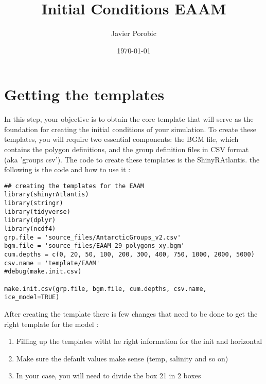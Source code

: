 \documentclass[a4paper]{article}
\author{Javier Porobic}
\date{\today}
\title{Initial Conditions EAAM}
\begin{document}
\maketitle
\tableofcontents

\tableofcontents

\section{Getting the templates}
\label{sec:org626dc59}
In this step, your objective is to obtain the core template that will serve as the
foundation for creating the initial conditions of your simulation. To create these
templates, you will require two essential components: the BGM file, which contains
the polygon definitions, and the group definition files in CSV format (aka 'groups
csv'). The code to create these templates is the ShinyRAtlantis. the following is the
code and how to use it :
\begin{verbatim}
## creating the templates for the EAAM
library(shinyrAtlantis)
library(stringr)
library(tidyverse)
library(dplyr)
library(ncdf4)
grp.file = 'source_files/AntarcticGroups_v2.csv'
bgm.file = 'source_files/EAAM_29_polygons_xy.bgm'
cum.depths = c(0, 20, 50, 100, 200, 300, 400, 750, 1000, 2000, 5000)
csv.name = 'template/EAAM'
#debug(make.init.csv)

make.init.csv(grp.file, bgm.file, cum.depths, csv.name, ice_model=TRUE)
\end{verbatim}

After creating the template there is few changes that need to be done to get the
right template for the model :
\begin{enumerate}
\item Filling up the templates witht he right information for the init and horizontal
\item Make sure the default values make sense (temp,  salinity and so on)
\item In your case, you will need to divide the box 21 in 2 boxes
\end{enumerate}
\end{document}
